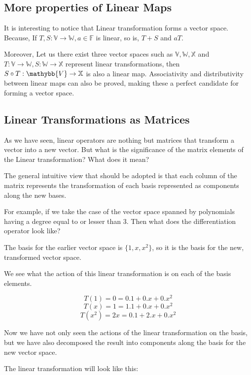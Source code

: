 \subsection{More properties of Linear Maps}

It is interesting to notice that Linear transformation forms a vector space. Because, If 
$T, S: \mathbb{V} \to \mathbb{W}, a\in \mathbb{F}$ is linear, so is, $T+S$ and $aT$.

Moreover, Let us there exist three vector spaces such as $\mathbb{V, W, X}$ and $T: \mathbb{V} \to \mathbb{W}, S: \mathbb{W} \to \mathbb{X}$ represent linear transformations, then $S \circ T: \mathybb{V} \to \mathbb{X}$ is also a linear map. Associativity and distributivity between linear maps can also be proved, making these a perfect candidate for forming a vector space. 


\subsection{Linear Transformations as Matrices}

As we have seen, linear operators are nothing but matrices that transform a vector into a new vector. But what is the significance of the matrix elements of the Linear transformation? What does it mean?

\begin{outline}
    The general intuitive view that should be adopted is that each column of the matrix represents the transformation of each basis represented as components along the new bases. 
\end{outline}

For example, if we take the case of the vector space spanned by polynomials having a degree equal to or lesser than 3. Then what does the differentiation operator look like?

The basis for the earlier vector space is $\{1,x,x^2\}$, so it is the basis for the new, transformed vector space. 

We see what the action of this linear transformation is on each of the basis elements.

$$T(1)=0= 0.1 + 0.x + 0.x^2$$
$$T(x)=1= 1.1 + 0.x + 0.x^2$$
$$T(x^2)=2x= 0.1 + 2.x+0.x^2$$

Now we have not only seen the actions of the linear transformation on the basis, but we have also decomposed the result into components along the basis for the new vector space. 


The linear transformation will look like this:

